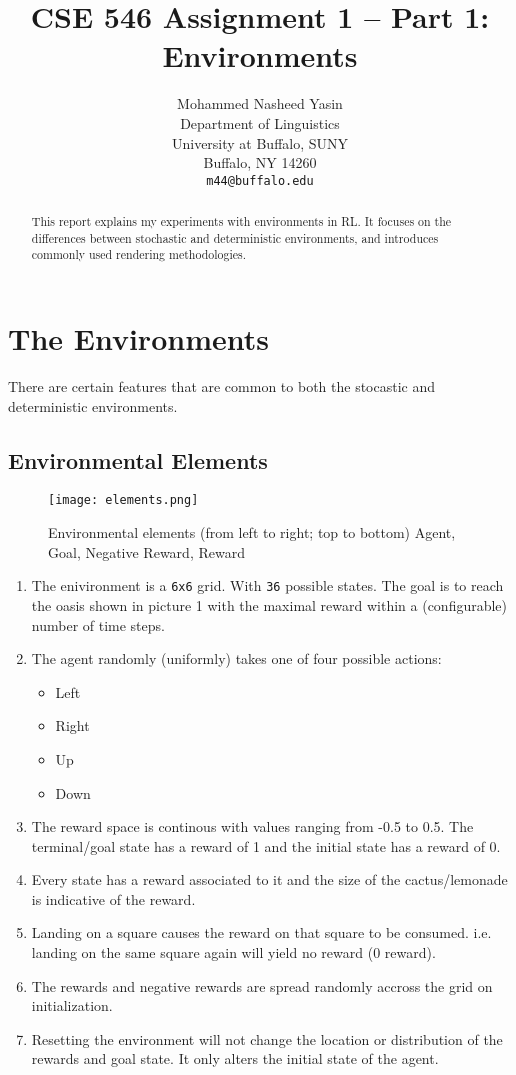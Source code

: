 \documentclass{article} %
\title{CSE 546 Assignment 1 -- Part 1: Environments}
\author{
   Mohammed Nasheed Yasin \\
   Department of Linguistics\\
   University at Buffalo, SUNY\\
   Buffalo, NY 14260 \\
   \texttt{m44@buffalo.edu}
}
\begin{document}
\maketitle

\begin{abstract}
    This report explains my experiments with environments in RL.
    It focuses on the differences between stochastic and deterministic environments,
    and introduces commonly used rendering methodologies.
\end{abstract}

\section{The Environments}

There are certain features that are common to both the stocastic and deterministic environments.

\subsection*{Environmental Elements}
\begin{figure}[h]
    \begin{center}
        \texttt{[image: elements.png]}
    \end{center}
    \caption{Environmental elements (from left to right; top to bottom) Agent, Goal,
        Negative Reward, Reward}
\end{figure}

\begin{enumerate}
    \item The enivironment is a \verb|6x6| grid. With \verb|36| possible states. The goal is
        to reach the oasis shown in picture 1 with the maximal reward within a 
        (configurable) number of time steps.
    \item The agent randomly (uniformly) takes one of four possible actions:
    \begin{itemize}
        \item Left
        \item Right
        \item Up
        \item Down
    \end{itemize}
    \item The reward space is continous with values ranging from -0.5 to 0.5. The terminal/goal state
        has a reward of 1 and the initial state has a reward of 0.
    \item Every state has a reward associated to it and the size of the 
        cactus/lemonade is indicative of the reward.
    \item Landing on a square causes the reward on that square to be consumed.
        i.e. landing on the same square again will yield no reward (0 reward).
    \item The rewards and negative rewards are spread randomly accross the grid on
        initialization.
    \item Resetting the environment will not change the location or distribution of the rewards
        and goal state. It only alters the initial state of the agent.
\end{enumerate}
\end{document}
